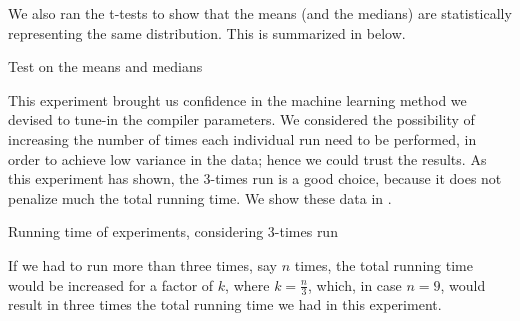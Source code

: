 We also ran the t-tests to show that the means (and the medians) are statistically representing the same distribution. This is summarized in  below.

\begin{table}
  \centering
  \begin{tiny}
  
  \end{tiny}
  \caption{Test on the means and medians}
  \label{tab:statTest}
\end{table}

This experiment brought us confidence in the machine learning method we devised to tune-in the compiler parameters. We considered the possibility of increasing the number of times each individual run need to be performed, in order to achieve low variance in the data; hence we could trust the results. As this experiment has shown, the $3$-times run is a good choice, because it does not penalize much the total running time. We show these data in .

\begin{table}
  \centering
  \begin{tiny}
  
  \end{tiny}
  \caption{Running time of experiments, considering $3$-times run}
  \label{tab:runTime}
\end{table}

If we had to run more than three times, say $n$ times, the total running time would be increased for a factor of $k$, where $k = \frac{n}{3}$, which, in case $n = 9$, would result in three times the total running time we had in this experiment.
